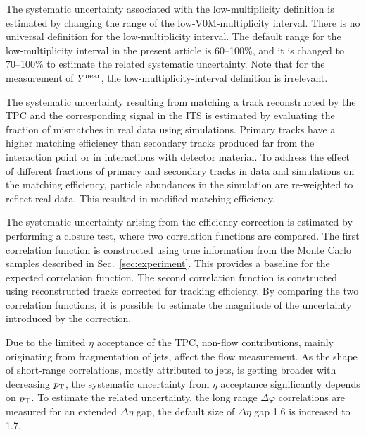 The systematic uncertainty associated with the low-multiplicity definition is estimated by changing the range of the low-V0M-multiplicity interval. There is no universal definition for the low-multiplicity interval. The default range for the low-multiplicity interval in the present article is 60--100\%, and it is changed to 70--100\% to estimate the related systematic uncertainty. 
Note that for the measurement of $Y^{\rm{near}}$, the low-multiplicity-interval definition is irrelevant. 

The systematic uncertainty resulting from matching a track reconstructed by the TPC and the corresponding signal in the ITS is estimated by evaluating the fraction of mismatches in real data using simulations. Primary tracks have a higher matching efficiency than secondary tracks produced far from the interaction point or in interactions with detector material. To address the effect of different fractions of primary and secondary tracks in data and simulations on the matching efficiency, particle abundances in the simulation are re-weighted to reflect real data. This resulted in modified matching efficiency.

The systematic uncertainty arising from the efficiency correction is estimated by performing a closure test, where two correlation functions are compared. The first correlation function is constructed using true information from the Monte Carlo samples described in Sec.~\ref{sec:experiment}. This provides a baseline for the expected correlation function. The second correlation function is constructed using reconstructed tracks corrected for tracking efficiency. By comparing the two correlation functions, it is possible to estimate the magnitude of the uncertainty introduced by the correction. 

Due to the limited $\eta$ acceptance of the TPC, non-flow contributions, mainly originating from fragmentation of jets, affect the flow measurement. As the shape of short-range correlations, mostly attributed to jets, is getting broader with decreasing $p_\mathrm{T}$, the systematic uncertainty from $\eta$ acceptance significantly depends on $p_{\rm{T}}$. To estimate the related uncertainty, the long range $\Delta\varphi$ correlations are measured for an extended $\Delta\eta$ gap, the default size of $\Delta\eta$ gap 1.6 is increased to 1.7.

